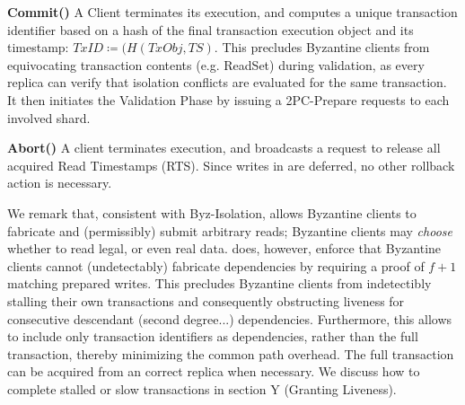\textbf{Commit()} A Client terminates its execution, and computes a unique transaction identifier based on a hash of the final transaction execution object and its timestamp: $TxID \coloneqq (H(TxObj, TS)$. This precludes Byzantine clients from equivocating transaction contents (e.g. ReadSet) during validation, as every replica can verify that isolation conflicts are evaluated for the same transaction.   It then initiates the Validation Phase by issuing a 2PC-Prepare requests to each involved shard.

\textbf{Abort()} A client terminates execution, and broadcasts a request to release all acquired Read Timestamps (RTS). Since writes in \sys are deferred, no other rollback action is necessary.

{} 
We remark that, consistent with Byz-Isolation, \sys allows Byzantine clients to fabricate and (permissibly) submit arbitrary reads; Byzantine clients may \textit{choose} whether to read legal, or even real data.  \sys does, however, enforce that Byzantine clients cannot (undetectably) fabricate dependencies by requiring a proof of $f+1$ matching prepared writes. This precludes Byzantine clients from indetectibly stalling their own transactions and consequently obstructing liveness for consecutive descendant (second degree...) dependencies.
Furthermore, this allows \sys to include only transaction identifiers as dependencies, rather than the full transaction, thereby minimizing the common path overhead. The full transaction can be acquired from an correct replica when necessary. We discuss how to complete stalled or slow transactions in section Y (Granting Liveness).




